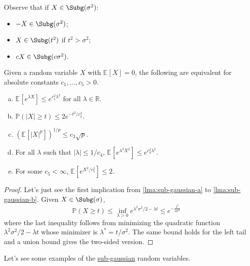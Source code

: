 \begin{remark}
  Observe that if \(X\in \Subg(\sigma ^{2} ) \):
  \begin{itemize}
    \item \(-X\in \Subg(\sigma ^{2} ) \);
    \item \(X \in \Subg(t^2) \) if \(t^2 > \sigma ^{2} \);
    \item \(cX\in \Subg(c \sigma ^{2} ) \).
  \end{itemize}
\end{remark}

\begin{lemma}\label{lma:sub-gaussian}
  Given a random variable \(X\) with \(\mathbb{E}_{}\left[X \right] =0\), the following are equivalent for absolute constants \(c_1, \dots , c_5 > 0\).
  \begin{enumerate}[(a)]
    \item\label{lma:sub-gaussian-a} \(\mathbb{E}_{}\left[e^{\lambda X} \right] \leq e^{c_1^2 \lambda ^2}\) for all \(\lambda \in \mathbb{R} \).
    \item\label{lma:sub-gaussian-b} \(\mathbb{P} (\vert X \vert \geq t) \leq 2 e^{- t^2 / c_2^2}\).
    \item\label{lma:sub-gaussian-c} \(\left( \mathbb{E}_{}\left[\vert X \vert ^p \right]  \right)^{1 / p} \leq c_3 \sqrt{p}  \).
    \item\label{lma:sub-gaussian-d} For all \(\lambda \) such that \(\vert \lambda  \vert \leq 1 / c_4 \), \(\mathbb{E}_{}\left[e^{\lambda ^2 X^2} \right] \leq e^{c_4^2 \lambda ^2} \).
    \item\label{lma:sub-gaussian-e} For some \(c_5 < \infty \), \(\mathbb{E}_{}\left[e^{X^2 / c_5^2}  \right] \leq 2\).
  \end{enumerate}
\end{lemma}
\begin{proof}
  Let's just see the first implication from \autoref{lma:sub-gaussian-a} to \autoref{lma:sub-gaussian-b}. Given \(X \in \Subg(\sigma ) \),
  \[
    \mathbb{P} (X\geq t) \leq \inf _{\lambda > 0} e^{\lambda ^2 \sigma ^2 / 2 - \lambda t} \leq e^{-\frac{t^2}{2\sigma ^2}}
  \]
  where the last inequality follows from minimizing the quadratic function \(\lambda ^{2} \sigma ^{2} / 2 - \lambda t\) whose minimizer is \(\lambda ^{\ast} = t / \sigma ^{2} \). The same bound holds for the left tail and a union bound gives the two-sided version.
\end{proof}

Let's see some examples of the \hyperref[def:sub-gaussian]{sub-gaussian} random variables.

